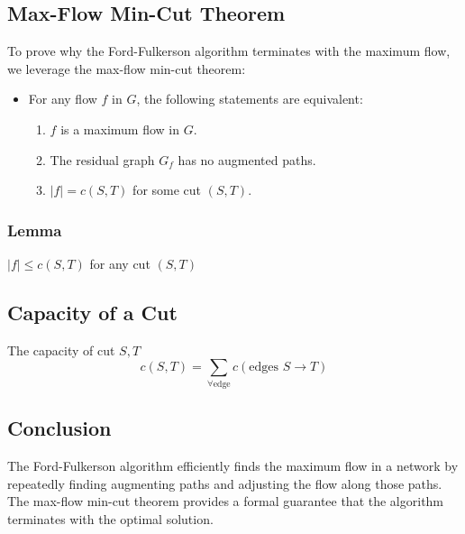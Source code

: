 \subsection{Max-Flow Min-Cut Theorem}
\begin{theorem}
    To prove why the Ford-Fulkerson algorithm terminates with the maximum flow, we leverage the max-flow min-cut theorem:
    \begin{itemize}
        \item For any flow $f$ in $G$, the following statements are equivalent:
        \begin{enumerate}
            \item $f$ is a maximum flow in $G$.
            \item The residual graph $G_f$ has no augmented paths.
            \item $|f| = c(S, T)$ for some cut $(S, T)$.
        \end{enumerate}
    \end{itemize}
\end{theorem}

\subsubsection{Lemma}
\begin{theorem}
    $|f| \leq c(S, T)$ for any cut $(S, T)$
\end{theorem}

\subsection{Capacity of a Cut}
\begin{definition} The capacity of cut $S,T$
    \[
    c(S, T) = \sum_{\forall \text{edge}} c(\text{edges } S \rightarrow T)
    \]
\end{definition}

\begin{example}
\end{example}

\subsection{Conclusion}
\begin{summary}
    The Ford-Fulkerson algorithm efficiently finds the maximum flow in a network by repeatedly finding augmenting paths and adjusting the flow along those paths. The max-flow min-cut theorem provides a formal guarantee that the algorithm terminates with the optimal solution.
\end{summary}

